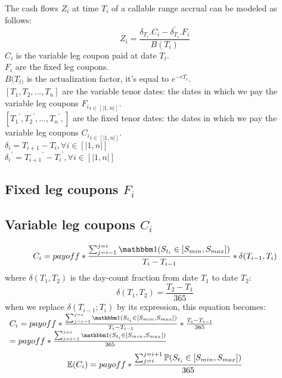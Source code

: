 \documentclass[12pt]{article}
\begin{document}
				The cash flows $Z_{i}$ at time $T_i$ of a callable range accrual can be modeled as follows:
				\begin{equation}
					Z_i=\frac{\delta_{T_i} . C_i -\delta_{T_i}^{'} . F_i}{B(T_i)}
				\end{equation}
				$C_{i}$ is the variable leg coupon paid at date $T_i$.\\
				$F_{i}$ are the fixed leg coupons.\\
				$B(T_{i)}$ is the actualization factor, it's equal to $e^{-rT_{i}}$.\\
				$[T_{1}, T_{2},..., T_{n}]$ are the variable tenor dates: the dates in which we pay the variable leg coupons ${F_{i}}_{i \in [|1,n|]}$.\\
				$[{T_{1}}^{'}, {T_{2}}^{'},..., {T_{n}}^{'},]$ are the fixed tenor dates: the dates in which we pay the variable leg coupons ${C_{i}}_{i \in [|1,n|]}$.\\
				${\delta}_{i} = T_{i+1} - T_{i},  \forall i \in [|1,n|]$\\
				${{\delta}_{i}}^{'} = {T_{i+1}}^{'} - {T_{i}}^{'},  \forall i \in [|1,n|]$\\

				\subsection{Fixed leg coupons $F_{i}$}
				\subsection{Variable leg coupons $C_{i}$}
					\begin{equation*}
						C_i=payoff * \frac{\sum_{j=i - 1}^{j=i}\indicator (S_{t_i} \in [S_{min},S_{max}])}{T_i - T_{i-1}} * \delta(T_{i-1}, T_i)
					\end{equation*}
					where $\delta(T_1, T_2) $ is the day-count fraction from date $T_1$ to date $T_2$:\\
					$$
					\delta(T_1, T_2) = \frac{T_2 - T_1}{365}
					$$
					when we replace $\delta(T_{i-1}; T_i)$ by its expression, this equation becomes:\\
					$\begin{array}{lcl}
					C_i=payoff * \frac{\sum_{j=i - 1}^{j=i}\indicator (S_{t_i} \in [S_{min},S_{max}])}{T_i - T_{i-1}} * \frac{T_i - T_{i-1}}{365} \\

					=payoff * \frac{\sum_{j=i - 1}^{j=i}\indicator (S_{t_i} \in [S_{min},S_{max}])}{365}
					\end{array}$
					\begin{equation*}
					\E(C_i)=payoff * \frac{\sum_{j=i}^{j=i+1} \PP (S_{t_i} \in [S_{min},S_{max}])}{365}
					\end{equation*}
					
\end{document}
